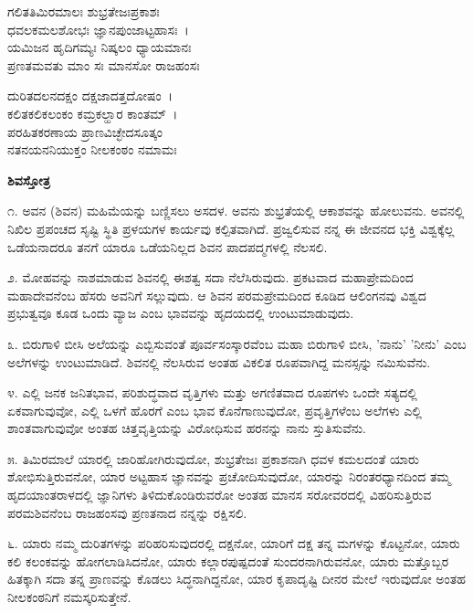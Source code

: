 
\begin{myquote}
ಗಲಿತತಿಮಿರಮಾಲಃ ಶುಭ್ರತೇಜಃಪ್ರಕಾಶಃ\\ಧವಲಕಮಲಶೋಭಃ ಜ್ಞಾನಪುಂಜಾಟ್ಟಹಾಸಃ~।\\ಯಮಿಜನ ಹೃದಿಗಮ್ಯಃ ನಿಷ್ಕಲಂ ಧ್ಯಾಯಮಾನಃ\\ಪ್ರಣತಮವತು ಮಾಂ ಸಃ ಮಾನಸೋ ರಾಜಹಂಸಃ
\end{myquote}


\begin{myquote}
ದುರಿತದಲನದಕ್ಷಂ ದಕ್ಷಜಾದತ್ತದೋಷಂ~।\\ಕಲಿತಕಲಿಕಲಂಕಂ ಕಮ್ರಕಲ್ಹಾರ ಕಾಂತಮ್~।\\ಪರಹಿತಕರಣಾಯ ಪ್ರಾಣವಿಚ್ಛೇದಸೂತ್ಕಂ\\ನತನಯನನಿಯುಕ್ತಂ ನೀಲಕಂಠಂ ನಮಾಮಃ
\end{myquote}


\begin{center}
\textbf{ಶಿವಸ್ತೋತ್ರ}
\end{center}

೧. ಅವನ (ಶಿವನ) ಮಹಿಮೆಯನ್ನು ಬಣ್ಣಿಸಲು ಅಸದಳ. ಅವನು ಶುಭ್ರತೆಯಲ್ಲಿ ಆಕಾಶವನ್ನು ಹೋಲುವನು. ಅವನಲ್ಲಿ ನಿಖಿಲ ಪ್ರಪಂಚದ ಸೃಷ್ಟಿ ಸ್ಥಿತಿ ಪ್ರಳಯಗಳ ಕಾರ್ಯವು ಕಲ್ಪಿತವಾಗಿದೆ. ಪ್ರಜ್ವಲಿಸುವ ನನ್ನ ಈ ಜೀವನದ ಭಕ್ತಿ ವಿಶ್ವಕ್ಕೆಲ್ಲ ಒಡೆಯನಾದರೂ ತನಗೆ ಯಾರೂ ಒಡೆಯನಿಲ್ಲದ ಶಿವನ ಪಾದಪದ್ಮಗಳಲ್ಲಿ ನೆಲಸಲಿ.

೨. ಮೋಹವನ್ನು ನಾಶಮಾಡುವ ಶಿವನಲ್ಲಿ ಈಶತ್ವ ಸದಾ ನೆಲೆಸಿರುವುದು. ಪ್ರಕಟವಾದ ಮಹಾಪ್ರೇಮದಿಂದ ಮಹಾದೇವನೆಂಬ ಹೆಸರು ಅವನಿಗೆ ಸಲ್ಲುವುದು. ಆ ಶಿವನ ಪರಮಪ್ರೇಮದಿಂದ ಕೂಡಿದ ಆಲಿಂಗನವು ವಿಶ್ವದ ಪ್ರಭುತ್ವವೂ ಕೂಡ ಒಂದು ವ್ಯಾಜ ಎಂಬ ಭಾವವನ್ನು ಹೃದಯದಲ್ಲಿ ಉಂಟುಮಾಡುವುದು.

೩. ಬಿರುಗಾಳಿ ಬೀಸಿ ಅಲೆಯನ್ನು ಎಬ್ಬಿಸುವಂತೆ ಪೂರ್ವಸಂಸ್ಕಾರವೆಂಬ ಮಹಾ ಬಿರುಗಾಳಿ ಬೀಸಿ, 'ನಾನು' 'ನೀನು' ಎಂಬ ಅಲೆಗಳನ್ನು ಉಂಟುಮಾಡಿದೆ. ಶಿವನಲ್ಲಿ ನೆಲಸಿರುವ ಅಂತಹ ವಿಕಲಿತ ರೂಪವಾಗಿದ್ದ ಮನಸ್ಸನ್ನು ನಮಿಸುವೆನು.

೪. ಎಲ್ಲಿ ಜನಕ ಜನಿತಭಾವ, ಪರಿಶುದ್ಧವಾದ ವೃತ್ತಿಗಳು ಮತ್ತು ಅಗಣಿತವಾದ ರೂಪಗಳು ಒಂದೇ ಸತ್ಯದಲ್ಲಿ ಏಕವಾಗುವುವೋ, ಎಲ್ಲಿ ಒಳಗೆ ಹೊರಗೆ ಎಂಬ ಭಾವ ಕೊನೆಗಾಣುವುದೋ, ಪ್ರವೃತ್ತಿಗಳೆಂಬ ಅಲೆಗಳು ಎಲ್ಲಿ ಶಾಂತವಾಗುವುವೋ ಅಂತಹ ಚಿತ್ತವೃತ್ತಿಯನ್ನು ವಿರೋಧಿಸುವ ಹರನನ್ನು ನಾನು ಸ್ತುತಿಸುವೆನು.

೫. ತಿಮಿರಮಾಲೆ ಯಾರಲ್ಲಿ ಜಾರಿಹೋಗಿರುವುದೋ, ಶುಭ್ರತೇಜಃ ಪ್ರಕಾಶನಾಗಿ ಧವಳ ಕಮಲದಂತೆ ಯಾರು ಶೋಭಿಸುತ್ತಿರುವನೋ, ಯಾರ ಅಟ್ಟಹಾಸ ಜ್ಞಾನವನ್ನು ಪ್ರಚೋದಿಸುವುದೋ, ಯಾರನ್ನು ನಿರಂತರಧ್ಯಾನದಿಂದ ತಮ್ಮ ಹೃದಯಾಂತರಾಳದಲ್ಲಿ ಜ್ಞಾನಿಗಳು ತಿಳಿದುಕೊಂಡಿರುವರೋ ಅಂತಹ ಮಾನಸ ಸರೋವರದಲ್ಲಿ ವಿಹರಿಸುತ್ತಿರುವ ಪರಮಶಿವನೆಂಬ ರಾಜಹಂಸವು ಪ್ರಣತನಾದ ನನ್ನನ್ನು ರಕ್ಷಿಸಲಿ.

೬. ಯಾರು ನಮ್ಮ ದುರಿತಗಳನ್ನು ಪರಿಹರಿಸುವುದರಲ್ಲಿ ದಕ್ಷನೋ, ಯಾರಿಗೆ ದಕ್ಷ ತನ್ನ ಮಗಳನ್ನು ಕೊಟ್ಟನೋ, ಯಾರು ಕಲಿ ಕಲಂಕವನ್ನು ಹೋಗಲಾಡಿಸಿದನೋ, ಯಾರು ಕಲ್ಲಾರಪುಷ್ಪದಂತೆ ಸುಂದರನಾಗಿರುವನೋ, ಯಾರು ಮತ್ತೊಬ್ಬರ ಹಿತಕ್ಕಾಗಿ ಸದಾ ತನ್ನ ಪ್ರಾಣವನ್ನು ಕೊಡಲು ಸಿದ್ಧನಾಗಿದ್ದನೋ, ಯಾರ ಕೃಪಾದೃಷ್ಟಿ ದೀನರ ಮೇಲೆ ಇರುವುದೋ ಅಂತಹ ನೀಲಕಂಠನಿಗೆ ನಮಸ್ಕರಿಸುತ್ತೇನೆ.

